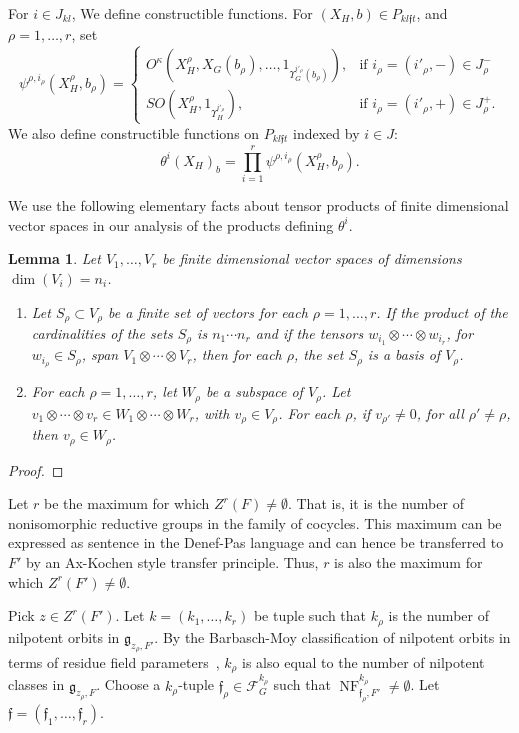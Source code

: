 \documentclass[12pt]{amsart}
\newcommand{\op}[1]{\operatorname{#1}}
\def\NF{\op{NF}}
\def\Y{\Upsilon}
\def\s{{\mathfrak{f}}}
\newcommand{\cF}{\mathcal{F}}
\newcommand{\fg}{\mathfrak{g}}
\theoremstyle{plain}
\newtheorem{lem}[thm]{Lemma}
\theoremstyle{definition}
\begin{document}
For $i\in J_{kl}$, 
We define constructible functions.  For $(X_H,b)\in
P_{kl\s t}$, and $\rho=1,\ldots,r$,
set
\[
\psi^{\rho,i_\rho}(X_H^\rho,b_\rho) = 
\begin{cases}   
  O^\kappa(X_H^\rho,X_G(b_\rho),\ldots,1_{\Y_G^{i'_\rho}(b_\rho)}),
   & \text{if } i_\rho = (i'_\rho,-)\in J^-_\rho \\
  SO(X_H^\rho,1_{\Y_H^{i'_\rho}}),
   & \text{if } i_\rho = (i'_\rho,+)\in J^+_\rho.
\end{cases}
\]
 We also define constructible functions
on $P_{kl\s t}$ indexed by $i\in J$:
\[
\theta^i(X_H)_b = \prod_{i=1}^r \psi^{\rho,i_\rho}(X_H^\rho,b_\rho).
\]

We use the following elementary facts about tensor products of
finite dimensional vector spaces in our analysis of the products
defining $\theta^i$.

\begin{lem}\label{thm:tensor}
Let $V_1,\ldots,V_r$ be finite dimensional vector spaces of
dimensions $\dim(V_i) = n_i$.  
\begin{enumerate}
\item 
Let $S_\rho\subset V_\rho$ be a finite set of vectors for each
  $\rho = 1,\ldots,r$. 
If the product of the cardinalities of the
  sets $S_\rho$ is $n_1\cdots n_r$ and if the tensors $w_{i_1}\otimes
 \cdots\otimes w_{i_r}$, for $w_{i_\rho}\in S_\rho$, span 
$V_1\otimes\cdots\otimes V_r$, then
  for each $\rho$, the set $S_\rho$ is a basis of $V_\rho$.
\item For each $\rho=1,\ldots,r$, let $W_\rho$ be a subspace of
$V_\rho$.  Let $v_{1}\otimes \cdots \otimes v_{r} \in
  W_1\otimes\cdots\otimes W_r$, with $v_{\rho}\in V_\rho$.  For
  each $\rho$, if $v_{{\rho'}}\ne0$, for all $\rho'\ne\rho$, then
  $v_{\rho}\in W_\rho$.
\end{enumerate}
\end{lem}

\begin{proof}
\end{proof}

Let $r$ be the maximum for which $Z^r(F)\ne\emptyset$.  That is, it is
the number of nonisomorphic reductive groups in the family of
cocycles.  This maximum can be expressed as sentence in the Denef-Pas
language and can hence be transferred to $F'$ by an Ax-Kochen style
transfer principle.  Thus, $r$ is also the maximum for which
$Z^r(F')\ne\emptyset$.

Pick $z\in Z^r(F')$.  Let $k=(k_1,\ldots,k_r)$ be tuple such that
$k_\rho$ is the number of nilpotent orbits in $\fg_{z_\rho,F'}$.  By the
Barbasch-Moy classification of nilpotent orbits in terms of residue
field parameters~\cite{barbasch-moy}, $k_\rho$ is also equal to the
number of nilpotent classes in $\fg_{z_\rho,F}$.  Choose a $k_\rho$-tuple
$\s_\rho\in \cF_G^{k_\rho}$ such that $\NF^{k_\rho}_{\s_\rho,F'}\ne
\emptyset$.  Let $\s = (\s_1,\ldots,\s_r)$.
\end{document}
